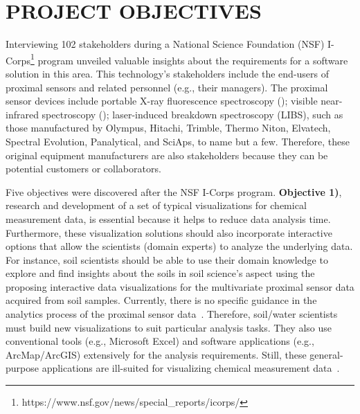 \chapter{PROJECT OBJECTIVES}
\label{chpt:userrequirements}
Interviewing 102 stakeholders during a National Science Foundation (NSF) I-Corps\footnote{https://www.nsf.gov/news/special\_reports/i\-corps/} program unveiled valuable insights about the requirements for a software solution in this area. This technology's stakeholders include the end-users of proximal sensors and related personnel (e.g., their managers). The proximal sensor devices include portable X-ray fluorescence spectroscopy (\pxrf{}); visible near-infrared spectroscopy (\visnir{}); laser-induced breakdown spectroscopy (LIBS), such as those manufactured by Olympus, Hitachi, Trimble, Thermo Niton, Elvatech, Spectral Evolution, Panalytical, and SciAps, to name but a few. Therefore, these original equipment manufacturers are also stakeholders because they can be potential customers or collaborators.

Five objectives were discovered after the NSF I-Corps program. \textbf{Objective 1)}, research and development of a set of typical visualizations for chemical measurement data, is essential because it helps to reduce data analysis time. Furthermore, these visualization solutions should also incorporate interactive options that allow the scientists (domain experts) to analyze the underlying data. For instance, soil scientists should be able to use their domain knowledge to explore and find insights about the soils in soil science's aspect using the proposing interactive data visualizations for the multivariate proximal sensor data acquired from soil samples. Currently, there is no specific guidance in the analytics process of the proximal sensor data~\cite{COLLINS2018Guidance}. Therefore, soil/water scientists must build new visualizations to suit particular analysis tasks. They also use conventional tools (e.g., Microsoft Excel) and software applications (e.g., ArcMap/ArcGIS) extensively for the analysis requirements. Still, these general-purpose applications are ill-suited for visualizing chemical measurement data~\cite{Ceneda2017Guidance}.

\begin{table}[h]
\caption {Statistics about common software used.\label{tab:softwares}} 
\end{table}

